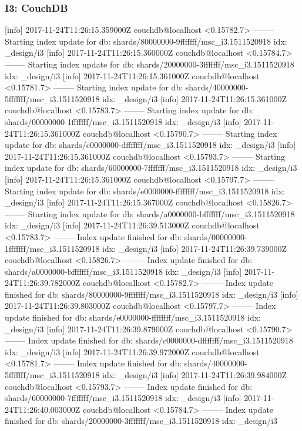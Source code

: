 \subsubsection*{I3: CouchDB}
[info] 2017-11-24T11:26:15.359000Z couchdb@localhost <0.15782.7> -------- Starting index update for db: shards/80000000-9fffffff/msc_i3.1511520918 idx: _design/i3
[info] 2017-11-24T11:26:15.360000Z couchdb@localhost <0.15784.7> -------- Starting index update for db: shards/20000000-3fffffff/msc_i3.1511520918 idx: _design/i3
[info] 2017-11-24T11:26:15.361000Z couchdb@localhost <0.15781.7> -------- Starting index update for db: shards/40000000-5fffffff/msc_i3.1511520918 idx: _design/i3
[info] 2017-11-24T11:26:15.361000Z couchdb@localhost <0.15783.7> -------- Starting index update for db: shards/00000000-1fffffff/msc_i3.1511520918 idx: _design/i3
[info] 2017-11-24T11:26:15.361000Z couchdb@localhost <0.15790.7> -------- Starting index update for db: shards/c0000000-dfffffff/msc_i3.1511520918 idx: _design/i3
[info] 2017-11-24T11:26:15.361000Z couchdb@localhost <0.15793.7> -------- Starting index update for db: shards/60000000-7fffffff/msc_i3.1511520918 idx: _design/i3
[info] 2017-11-24T11:26:15.361000Z couchdb@localhost <0.15797.7> -------- Starting index update for db: shards/e0000000-ffffffff/msc_i3.1511520918 idx: _design/i3
[info] 2017-11-24T11:26:15.367000Z couchdb@localhost <0.15826.7> -------- Starting index update for db: shards/a0000000-bfffffff/msc_i3.1511520918 idx: _design/i3
[info] 2017-11-24T11:26:39.513000Z couchdb@localhost <0.15783.7> -------- Index update finished for db: shards/00000000-1fffffff/msc_i3.1511520918 idx: _design/i3
[info] 2017-11-24T11:26:39.739000Z couchdb@localhost <0.15826.7> -------- Index update finished for db: shards/a0000000-bfffffff/msc_i3.1511520918 idx: _design/i3
[info] 2017-11-24T11:26:39.782000Z couchdb@localhost <0.15782.7> -------- Index update finished for db: shards/80000000-9fffffff/msc_i3.1511520918 idx: _design/i3
[info] 2017-11-24T11:26:39.803000Z couchdb@localhost <0.15797.7> -------- Index update finished for db: shards/e0000000-ffffffff/msc_i3.1511520918 idx: _design/i3
[info] 2017-11-24T11:26:39.879000Z couchdb@localhost <0.15790.7> -------- Index update finished for db: shards/c0000000-dfffffff/msc_i3.1511520918 idx: _design/i3
[info] 2017-11-24T11:26:39.972000Z couchdb@localhost <0.15781.7> -------- Index update finished for db: shards/40000000-5fffffff/msc_i3.1511520918 idx: _design/i3
[info] 2017-11-24T11:26:39.984000Z couchdb@localhost <0.15793.7> -------- Index update finished for db: shards/60000000-7fffffff/msc_i3.1511520918 idx: _design/i3
[info] 2017-11-24T11:26:40.003000Z couchdb@localhost <0.15784.7> -------- Index update finished for db: shards/20000000-3fffffff/msc_i3.1511520918 idx: _design/i3